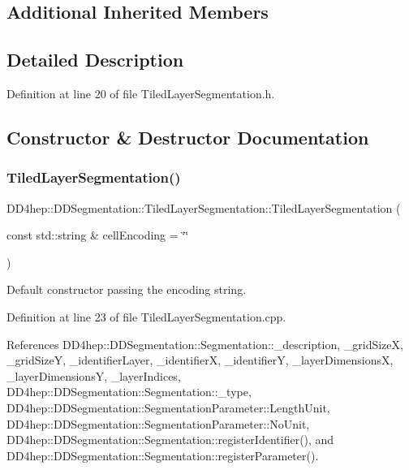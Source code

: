 \subsection*{Additional Inherited Members}


\subsection{Detailed Description}


Definition at line 20 of file Tiled\+Layer\+Segmentation.\+h.



\subsection{Constructor \& Destructor Documentation}
\hypertarget{class_d_d4hep_1_1_d_d_segmentation_1_1_tiled_layer_segmentation_a9f5fb19402d8d5bfbfb6d3db886bdfe3}{}\label{class_d_d4hep_1_1_d_d_segmentation_1_1_tiled_layer_segmentation_a9f5fb19402d8d5bfbfb6d3db886bdfe3} 
\subsubsection{\texorpdfstring{Tiled\+Layer\+Segmentation()}{TiledLayerSegmentation()}\hspace{0.1cm}{\footnotesize\ttfamily [1/2]}}
{\footnotesize\ttfamily D\+D4hep\+::\+D\+D\+Segmentation\+::\+Tiled\+Layer\+Segmentation\+::\+Tiled\+Layer\+Segmentation (\begin{DoxyParamCaption}\item[{const std\+::string \&}]{cell\+Encoding = {\ttfamily \char`\"{}\char`\"{}} }\end{DoxyParamCaption})}



Default constructor passing the encoding string. 



Definition at line 23 of file Tiled\+Layer\+Segmentation.\+cpp.



References D\+D4hep\+::\+D\+D\+Segmentation\+::\+Segmentation\+::\+\_\+description, \+\_\+grid\+SizeX, \+\_\+grid\+SizeY, \+\_\+identifier\+Layer, \+\_\+identifierX, \+\_\+identifierY, \+\_\+layer\+DimensionsX, \+\_\+layer\+DimensionsY, \+\_\+layer\+Indices, D\+D4hep\+::\+D\+D\+Segmentation\+::\+Segmentation\+::\+\_\+type, D\+D4hep\+::\+D\+D\+Segmentation\+::\+Segmentation\+Parameter\+::\+Length\+Unit, D\+D4hep\+::\+D\+D\+Segmentation\+::\+Segmentation\+Parameter\+::\+No\+Unit, D\+D4hep\+::\+D\+D\+Segmentation\+::\+Segmentation\+::register\+Identifier(), and D\+D4hep\+::\+D\+D\+Segmentation\+::\+Segmentation\+::register\+Parameter().

